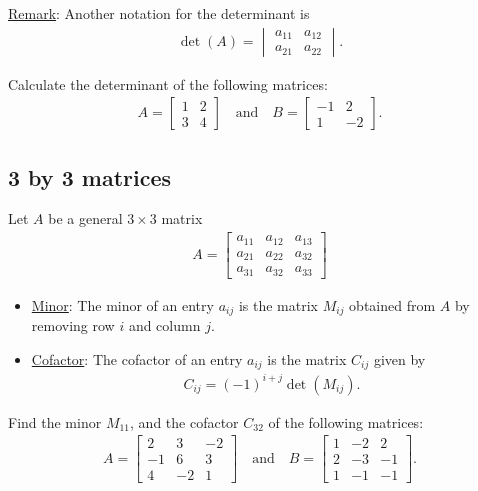 \documentclass[12pt,a4paper]{article}
\newcounter{example}[section]
\begin{document}
	\noindent\underline{Remark}: Another notation for the determinant is
		\begin{align*}
		\det (A) = \begin{vmatrix}
		a_{11} & a_{12} \\ a_{21} & a_{22}
		\end{vmatrix} .
		\end{align*}
		
	\begin{example}
	Calculate the determinant of the following matrices:
		\begin{align*}
		A = \begin{bmatrix}
		1 & 2 \\ 3 & 4
		\end{bmatrix}
		\quad \text{and} \quad B = \begin{bmatrix}
		-1 & 2 \\ 1 & -2
		\end{bmatrix} .
		\end{align*}
	\end{example}
	
	\newpage
	
	\subsection{3 by 3 matrices}
	Let $A$ be a general $3 \times 3$ matrix
		\begin{align*}
		A = \begin{bmatrix}
		a_{11} & a_{12} & a_{13} \\ a_{21} & a_{22} & a_{32} \\
		a_{31} & a_{32} & a_{33}
		\end{bmatrix}
		\end{align*}
		
		\begin{itemize}
		\item \underline{Minor}: The minor of an entry $a_{ij}$ is the matrix $M_{ij}$ obtained from $A$ by removing row $i$ and column $j$.
		\item \underline{Cofactor}: The cofactor of an entry $a_{ij}$ is the matrix $C_{ij}$ given by
			\begin{align*}
			C_{ij} = (-1)^{i + j} \det (M_{ij}) .
			\end{align*}
		\end{itemize}
		
	\begin{example}
	Find the minor $M_{11}$, and the cofactor $C_{32}$ of the following matrices:
	\begin{align*}
		A = \begin{bmatrix}
		2 & 3 & -2 \\ -1 & 6 & 3 \\ 4 & -2 & 1
		\end{bmatrix}
		\quad \text{and} \quad
		B = \begin{bmatrix}
		1 & -2 & 2 \\ 2 & -3 & -1 \\ 1 & -1 & -1
		\end{bmatrix} .
		\end{align*}
	\end{example}
	
\end{document}
